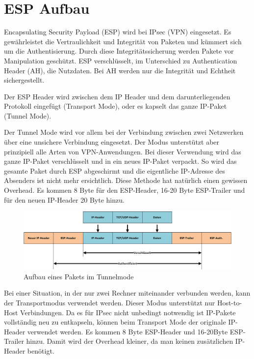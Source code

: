 \section{ESP Aufbau}
\label{sec:ESP Aufbau}

\noindent Encapsulating Security Payload (ESP) wird bei \ac{IPsec} (VPN) eingesetzt. Es gewährleistet die Vertraulichkeit und Integrität von Paketen und kümmert sich um die Authentisierung. Durch diese Integritätssicherung werden Pakete vor Manipulation geschützt. ESP verschlüsselt, im Unterschied zu Authentication Header (AH), die Nutzdaten. Bei AH werden nur die Integrität und Echtheit sichergestellt.\cite{elektronik_kompendium}

\noindent Der ESP Header wird zwischen dem IP Header und dem darunterliegenden Protokoll eingefügt (Transport Mode), oder es kapselt das ganze IP-Paket (Tunnel Mode).\cite{rfc4303}

\noindent Der Tunnel Mode wird vor allem bei der Verbindung zwischen zwei Netzwerken über eine unsichere Verbindung eingesetzt. Der Modus unterstützt aber prinzipiell alle Arten von VPN-Anwendungen. Bei dieser Verwendung wird das ganze IP-Paket verschlüsselt und in ein neues IP-Paket verpackt. So wird das gesamte Paket durch ESP abgeschirmt und die eigentliche IP-Adresse des Absenders ist nicht mehr ersichtlich. Diese Methode hat natürlich einen gewissen Overhead. Es kommen 8 Byte für den ESP-Header, 16-20 Byte ESP-Trailer und für den neuen IP-Header 20 Byte hinzu.\cite{elektronik_kompendium}

\begin{figure}[H]
    \begin{center}
        \includegraphics[trim=1 0 0 0,clip,width=\textwidth]{mainpart/analyse/img/ESP_Tunnelmode.png}
    \end{center}
    \caption{Aufbau eines Pakets im Tunnelmode}
\end{figure}

\noindent Bei einer Situation, in der nur zwei Rechner miteinander verbunden werden, kann der Transportmodus verwendet werden. Dieser Modus unterstützt nur Host-to-Host Verbindungen. Da es für \ac{IPsec} nicht unbedingt notwendig ist IP-Pakete vollständig neu zu entkapseln, können beim Transport Mode der originale IP-Header verwendet werden. Es kommen 8 Byte ESP-Header und 16-20Byte ESP-Trailer hinzu. Damit wird der Overhead kleiner, da man keinen zusätzlichen IP-Header benötigt.\cite{elektronik_kompendium}

